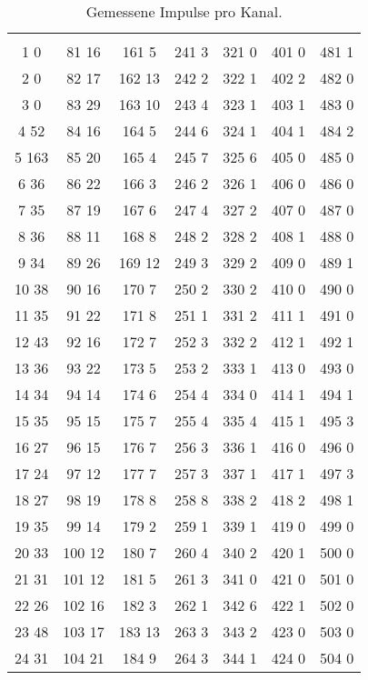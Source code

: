 \begin{table}
 \centering
 \caption{Gemessene Impulse pro Kanal.}
 \label{tab:Messwerte}
 \begin{tabular}{c | c | c | c | c | c | c}
 \toprule \\
 1 0 & 81 16 & 161 5 & 241 3 & 321 0 & 401 0      & 481 1\\
 2 0 & 82 17 & 162 13 & 242 2 & 322 1 & 402 2     & 482 0\\
 3 0 & 83 29 & 163 10 & 243 4 & 323 1 & 403 1     & 483 0\\
 4 52 & 84 16 & 164 5 & 244 6 & 324 1 & 404 1     & 484 2\\
 5 163 & 85 20 & 165 4 & 245 7 & 325 6 & 405 0    & 485 0\\
 6 36 & 86 22 & 166 3 & 246 2 & 326 1 & 406 0     & 486 0\\
 7 35 & 87 19 & 167 6 & 247 4 & 327 2 & 407 0     & 487 0\\
 8 36 & 88 11 & 168 8 & 248 2 & 328 2 & 408 1     & 488 0\\
 9 34 & 89 26 & 169 12 & 249 3 & 329 2 & 409 0    & 489 1\\
 10 38 & 90 16 & 170 7 & 250 2 & 330 2 & 410 0    & 490 0\\
 11 35 & 91 22 & 171 8 & 251 1 & 331 2 & 411 1    & 491 0\\
 12 43 & 92 16 & 172 7 & 252 3 & 332 2 & 412 1    & 492 1\\
 13 36 & 93 22 & 173 5 & 253 2 & 333 1 & 413 0    & 493 0\\
 14 34 & 94 14 & 174 6 & 254 4 & 334 0 & 414 1    & 494 1\\
 15 35 & 95 15 & 175 7 & 255 4 & 335 4 & 415 1    & 495 3\\
 16 27 & 96 15 & 176 7 & 256 3 & 336 1 & 416 0    & 496 0\\
 17 24 & 97 12 & 177 7 & 257 3 & 337 1 & 417 1    & 497 3\\
 18 27 & 98 19 & 178 8 & 258 8 & 338 2 & 418 2    & 498 1\\
 19 35 & 99 14 & 179 2 & 259 1 & 339 1 & 419 0    & 499 0\\
 20 33 & 100 12 & 180 7 & 260 4 & 340 2 & 420 1   & 500 0\\
 21 31 & 101 12 & 181 5 & 261 3 & 341 0 & 421 0   & 501 0\\
 22 26 & 102 16 & 182 3 & 262 1 & 342 6 & 422 1   & 502 0\\
 23 48 & 103 17 & 183 13 & 263 3 & 343 2 & 423 0  & 503 0\\
 24 31 & 104 21 & 184 9 & 264 3 & 344 1 & 424 0   & 504 0\\

\end{tabular}
\end{table}

